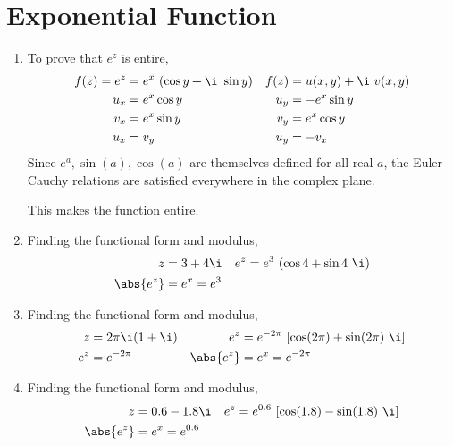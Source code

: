 \section{Exponential Function}

\begin{enumerate}
    \item To prove that $ e^z $ is entire,
          \begin{align}
              f(z) = e^z & = e^x\ (\cos y + \i\ \sin y) &
              f(z)       & = u(x, y) + \i\ v(x, y)        \\
              u_x        & = e^x \cos y                 &
              u_y        & = -e^x \sin y                  \\
              v_x        & = e^x \sin y                 &
              v_y        & = e^x \cos y                   \\
              u_x        & = v_y                        &
              u_y        & = -v_x
          \end{align}
          Since $ e^a, \sin(a), \cos(a) $ are themselves defined for all real $ a $,
          the Euler-Cauchy relations are satisfied everywhere in the complex plane. \par
          This makes the function entire.

    \item Finding the functional form and modulus,
          \begin{align}
              z         & = 3 + 4\i   & e^z & = e^3\ (\cos 4 + \sin 4\ \i) \\
              \abs{e^z} & = e^x = e^3
          \end{align}

    \item Finding the functional form and modulus,
          \begin{align}
              z         & = 2\pi \i (1 + \i)                         &
              e^z       & = e^{-2\pi}\ [\cos(2\pi) + \sin(2\pi)\ \i]   \\
              e^z       & = e^{-2\pi}                                &
              \abs{e^z} & = e^x = e^{-2\pi}
          \end{align}

    \item Finding the functional form and modulus,
          \begin{align}
              z         & = 0.6 - 1.8\i                          &
              e^z       & = e^{0.6}\ [\cos(1.8) - \sin(1.8)\ \i]   \\
              \abs{e^z} & = e^x = e^{0.6}
          \end{align}


\end{enumerate}
